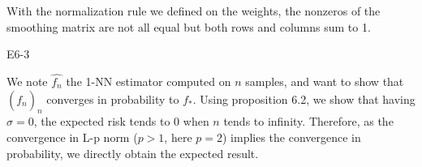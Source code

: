\begin{questions}
\begin{solution}
\begin{parts}
            With the normalization rule we defined on the weights, the nonzeros of the smoothing matrix are not all equal but both rows and columns sum to 1. 
    \end{parts}

    \end{solution}
    
    \question E6-3

    \begin{solution}
    We note $\hat{f_n}$ the 1-NN estimator computed on $n$ samples, and want to show that $(\hat{f_n})_n$ converges in probability to $f_*$.
    Using proposition 6.2, we show that having $\sigma = 0$, the expected risk tends to $0$ when $n$ tends to infinity.
    Therefore, as the convergence in L-p norm ($p>1$, here $p=2$) implies the convergence in probability, we directly obtain the expected result.
\end{solution}
\end{questions}